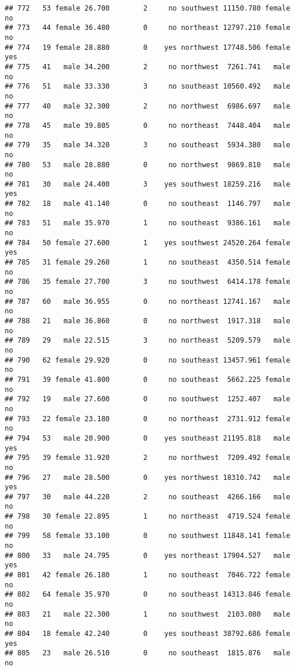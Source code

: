 \documentclass[
]{article}
\begin{document}
\begin{verbatim}
## 772   53 female 26.700        2     no southwest 11150.780 female       no
## 773   44 female 36.480        0     no northeast 12797.210 female       no
## 774   19 female 28.880        0    yes northwest 17748.506 female      yes
## 775   41   male 34.200        2     no northwest  7261.741   male       no
## 776   51   male 33.330        3     no southeast 10560.492   male       no
## 777   40   male 32.300        2     no northwest  6986.697   male       no
## 778   45   male 39.805        0     no northeast  7448.404   male       no
## 779   35   male 34.320        3     no southeast  5934.380   male       no
## 780   53   male 28.880        0     no northwest  9869.810   male       no
## 781   30   male 24.400        3    yes southwest 18259.216   male      yes
## 782   18   male 41.140        0     no southeast  1146.797   male       no
## 783   51   male 35.970        1     no southeast  9386.161   male       no
## 784   50 female 27.600        1    yes southwest 24520.264 female      yes
## 785   31 female 29.260        1     no southeast  4350.514 female       no
## 786   35 female 27.700        3     no southwest  6414.178 female       no
## 787   60   male 36.955        0     no northeast 12741.167   male       no
## 788   21   male 36.860        0     no northwest  1917.318   male       no
## 789   29   male 22.515        3     no northeast  5209.579   male       no
## 790   62 female 29.920        0     no southeast 13457.961 female       no
## 791   39 female 41.800        0     no southeast  5662.225 female       no
## 792   19   male 27.600        0     no southwest  1252.407   male       no
## 793   22 female 23.180        0     no northeast  2731.912 female       no
## 794   53   male 20.900        0    yes southeast 21195.818   male      yes
## 795   39 female 31.920        2     no northwest  7209.492 female       no
## 796   27   male 28.500        0    yes northwest 18310.742   male      yes
## 797   30   male 44.220        2     no southeast  4266.166   male       no
## 798   30 female 22.895        1     no northeast  4719.524 female       no
## 799   58 female 33.100        0     no southwest 11848.141 female       no
## 800   33   male 24.795        0    yes northeast 17904.527   male      yes
## 801   42 female 26.180        1     no southeast  7046.722 female       no
## 802   64 female 35.970        0     no southeast 14313.846 female       no
## 803   21   male 22.300        1     no southwest  2103.080   male       no
## 804   18 female 42.240        0    yes southeast 38792.686 female      yes
## 805   23   male 26.510        0     no southeast  1815.876   male       no

\end{verbatim}
\end{document}
